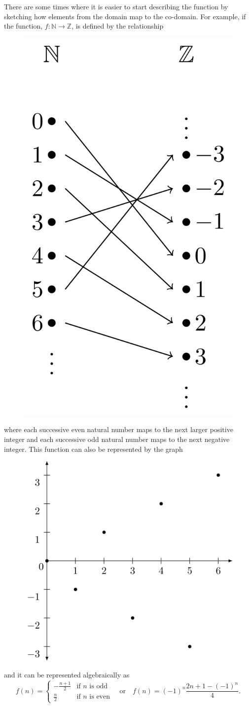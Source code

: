 \documentclass[
]{book}
\theoremstyle{definition}
\theoremstyle{definition}
\theoremstyle{definition}
\theoremstyle{definition}
\theoremstyle{remark}
\begin{document}
There are some times where it is easier to start describing the function by sketching how elements from the domain map to the co-domain. For example, if the function, \(f:\mathbb{N}\rightarrow \mathbb{Z}\), is defined by the relationship

\begin{figure}
 
 {\centering \includegraphics[width=0.3\linewidth]{tikz/table-natural-integers} 
 
 }
 
 \end{figure}

where each successive even natural number maps to the next larger positive integer and each successive odd natural number maps to the next negative integer. This function can also be represented by the graph

\begin{figure}
 
 {\centering \includegraphics[width=0.5\linewidth]{tikz/graph-natural-integers} 
 
 }
 
 \end{figure}

and it can be represented algebraically as \[f(n) = \begin{cases}
-\frac{n+1}{2}  & \mbox{if } n \mbox{ is odd}\\
\frac{n}{2}  & \mbox{if } n \mbox{ is even}
 \end{cases} \quad \mbox{or} \quad f(n)=(-1)^n\frac{2n+1-(-1)^n}{4}.\]
\end{document}
